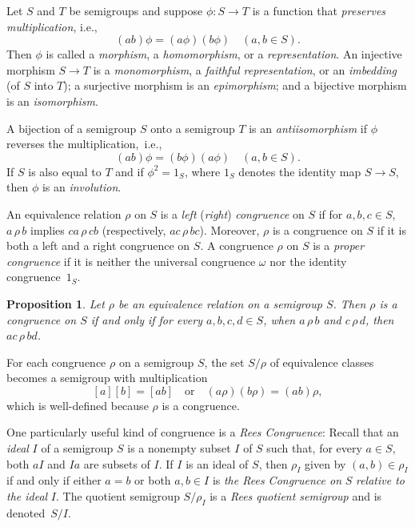 \documentclass{surv-l}
\numberwithin{equation}{section}
\numberwithin{table}{section}
\numberwithin{figure}{section}
\theoremstyle{plain}
\newtheorem{proposition}[equation]{Proposition}
\theoremstyle{definition}
\begin{document}
Let $S$ and $T$ be semigroups and suppose $\phi : S\rightarrow T$
is a function that \emph{preserves multiplication}, i.e.,
\[
(ab)\phi=(a\phi)(b\phi)\quad (a, b\in S).
\]
Then $\phi$ is called a \emph{morphism}, a
\emph{homomorphism}, or a
\emph{representation}. An injective morphism $S\rightarrow T$ is a
\emph{monomorphism}, a \emph{faithful
representation}, or an
\emph{imbedding} (of $S$ into $T$); a surjective
morphism is an \emph{epimorphism}; and a
bijective morphism is an \emph{isomorphism}.

A bijection of a semigroup $S$ onto a semigroup $T$ is an
\emph{antiisomorphism} if $\phi$ reverses
the multiplication,~i.e.,
\[
(ab)\phi=(b\phi)(a\phi)\quad (a, b\in S).
\]
If $S$ is also equal to $T$ and if $\phi^{2}=1_{S}$, where $1_{S}$
denotes the identity map $S\rightarrow S$, then $\phi$ is an
\emph{involution}.

An equivalence relation $\rho$ on $S$ is a \emph{left}
(\emph{right}) \emph{congruence} on $S$ if for $a, b, c\in S$,
$a\,\rho\,b$ implies $ca\,\rho\,cb$ (respectively, $ac\,\rho\,bc$).
Moreover, $\rho$ is a congruence on $S$ if it is both a left and a
right congruence on $S$. A congruence $\rho$ on $S$ is a
\emph{proper congruence} if it is neither
the universal congruence $\omega$ nor the identity
congruence~$1_{S}$.

\begin{proposition}\label{propA.76.1}
Let $\rho$ be an equivalence relation on a semigroup $S$. Then
$\rho$ is a congruence on $S$ if and only if for every $a, b,
c, d\in S$, when $a\,\rho\,b$ and $c\,\rho\,d$, then $ac\,\rho\,bd$.
\end{proposition}

For each congruence $\rho$ on a semigroup $S$, the set
$S/\rho$ of equivalence classes becomes a semigroup with
multiplication
\[
[a][b]=[ab]\quad \mathrm{or}\quad (a\rho)(b\rho)=(ab)\rho,
\]
which is well-defined because $\rho$ is a congruence.

One particularly useful kind of congruence is a \emph{Rees
Congruence}: Recall that an
\emph{ideal} $I$ of a semigroup $S$ is a nonempty
subset $I$ of $S$ such that, for every $a\in S$, both $aI$ and
$Ia$ are subsets of $I$. If $I$ is an ideal of $S$, then $\rho_{I}$
given by $(a, b)\in\rho_{I}$ if and only if either $a=b$ or both
$a,  b\in I$ is \emph{the Rees Congruence on} $S$ \emph{relative
to the ideal} $I$. The quotient semigroup $S/\rho_{I}$ is a
\emph{Rees quotient semigroup} and is denoted~$S/I$.
\end{document}
